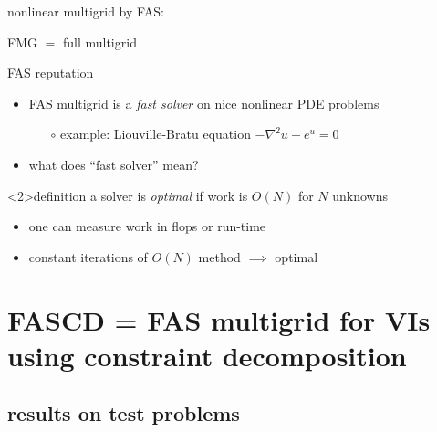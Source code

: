 \documentclass[svgnames,
               hyperref={colorlinks,citecolor=DeepPink4,linkcolor=FireBrick,urlcolor=Maroon},
               usepdftitle=false]  %
               {beamer}
\begin{document}
\begin{frame}{nonlinear multigrid by FAS: }
{\centering


FMG $=$ full multigrid

\vspace{6mm}
}
\end{frame}


\begin{frame}{FAS reputation}

\begin{itemize}
\item FAS multigrid is a \emph{fast solver} on nice nonlinear PDE problems
    \begin{itemize}
    \item[$\circ$] example: Liouville-Bratu equation $-\nabla^2 u - e^u = 0$
    \end{itemize}

\bigskip
\item<2> what does ``fast solver'' mean?
\end{itemize}

\begin{block}<2>{definition} a solver is \emph{optimal} if work is $O(N)$ for $N$ unknowns
\end{block}

\begin{itemize}
\item<2> one can measure work in flops or run-time
\item<2> constant iterations of $O(N)$ method $\implies$ optimal
\end{itemize}
\end{frame}


\section{FASCD = FAS multigrid for VIs using constraint decomposition}

\subsection{results on test problems}
\end{document}
